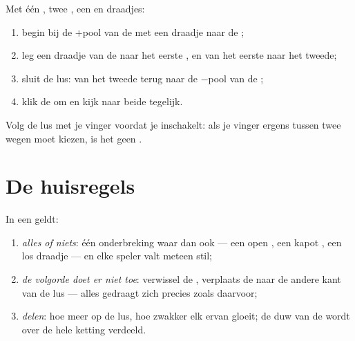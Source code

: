 \begin{method}\label{met:g4:series-circuits:build}
Met één , twee , een  en draadjes:
\begin{enumerate}
  \item begin bij de $+$pool van de  met een draadje naar de
        ;
  \item leg een draadje van de  naar het eerste , en
        van het eerste  naar het tweede;
  \item sluit de lus: van het tweede  terug naar de
        $-$pool van de ;
  \item klik de  om en kijk naar beide  tegelijk.
\end{enumerate}
Volg de lus met je vinger voordat je inschakelt: als je vinger ergens
tussen twee wegen moet kiezen, is het geen .
\end{method}

\section{De huisregels}

\begin{proposition}\label{prop:g4:series-circuits:rules}
In een  geldt:
\begin{enumerate}
  \item \emph{alles of niets}: één onderbreking waar dan ook --- een
        open , een kapot , een los draadje --- en elke
        speler valt meteen stil;
  \item \emph{de volgorde doet er niet toe}: verwissel de
        , verplaats de  naar de andere kant van de
        lus --- alles gedraagt zich precies zoals daarvoor;
  \item \emph{delen}: hoe meer  op de lus, hoe zwakker elk
        ervan gloeit; de duw van de  wordt over de hele
        ketting verdeeld.
\end{enumerate}
\end{proposition}

